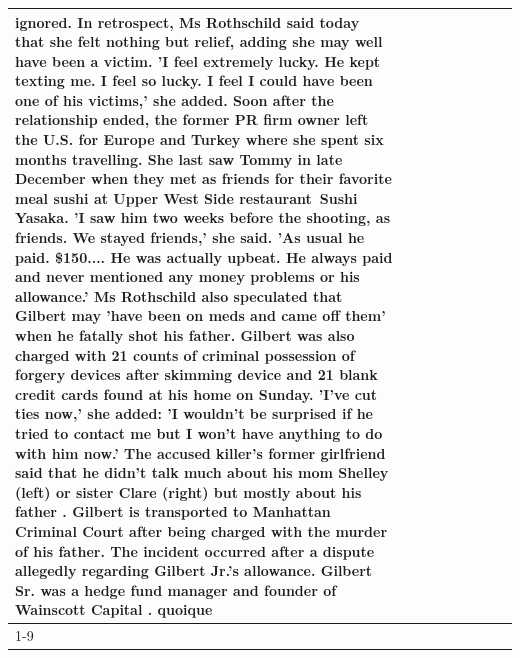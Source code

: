 \begin{table}[H]
\begin{tabular}{lllrlllll}
ignored. In retrospect, Ms Rothschild said today that she felt nothing but relief, adding she may well have been a victim. 'I feel extremely lucky. He kept texting me. I feel so lucky. I feel I could have been one of his victims,' she added. Soon after the relationship ended, the former PR firm owner left the U.S. for Europe and Turkey where she spent six months  travelling. She last saw Tommy in late December when they met as friends for their favorite meal sushi at Upper West Side restaurant Sushi Yasaka. 'I saw him two weeks before the shooting, as friends. We stayed friends,' she said. 'As usual he paid. \$150.... He was actually upbeat. He always paid and never mentioned any money problems or his allowance.' Ms Rothschild also speculated that Gilbert may 'have been on meds and came off them' when he fatally shot his father. Gilbert was also charged with 21 counts of criminal possession of forgery devices after skimming device and 21 blank credit cards found at his home on Sunday. 'I've cut ties now,' she added: 'I wouldn’t be surprised if he tried to contact me but I won’t have anything to do with him now.' The accused killer's former girlfriend said that he didn't talk much about his mom Shelley (left) or sister Clare (right) but mostly about his father . Gilbert is transported to Manhattan Criminal Court  after being charged with the murder of his father. The incident occurred after a dispute allegedly regarding Gilbert Jr.'s allowance. Gilbert Sr. was a hedge fund manager and founder of Wainscott Capital . quoique \\
\cline{1-9}

\end{tabular}
\end{table}
